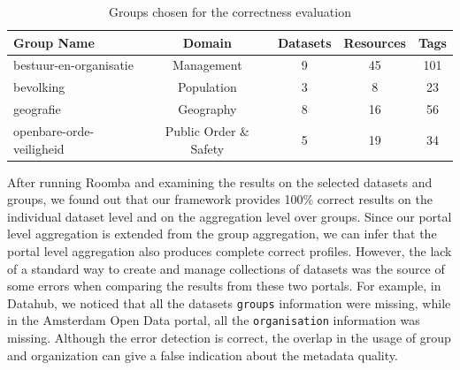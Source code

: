 \documentclass[runningheads,a4paper]{llncs}
\begin{document}
\begin{table}[ht]
\centering
\begin{tabular}{|l|c|c|c|c|}
\hline
\textbf{Group Name}      & \textbf{Domain}        & \multicolumn{1}{l|}{\textbf{Datasets}} & \multicolumn{1}{l|}{\textbf{Resources}} & \multicolumn{1}{l|}{\textbf{Tags}} \\ \hline
bestuur-en-organisatie   & Management             & 9                                      & 45                                      & 101                                \\ \hline
bevolking                & Population             & 3                                      & 8                                       & 23                                 \\ \hline
geografie                & Geography              & 8                                      & 16                                      & 56                                 \\ \hline
openbare-orde-veiligheid & Public Order \& Safety & 5                                      & 19                                      & 34                                 \\ \hline
\end{tabular}
\caption{Groups chosen for the correctness evaluation}
\label{tab:groups_experiment}
\end{table}

After running Roomba and examining the results on the selected datasets and groups, we found out that our framework provides 100\% correct results on the individual dataset level and on the aggregation level over groups. Since our portal level aggregation is extended from the group aggregation, we can infer that the portal level aggregation also produces complete correct profiles. However, the lack of a standard way to create and manage collections of datasets was the source of some errors when comparing the results from these two portals. For example, in Datahub, we noticed that all the datasets \texttt{groups} information were missing, while in the Amsterdam Open Data portal, all the \texttt{organisation} information was missing. Although the error detection is correct, the overlap in the usage of group and organization can give a false indication about the metadata quality.
\end{document}
